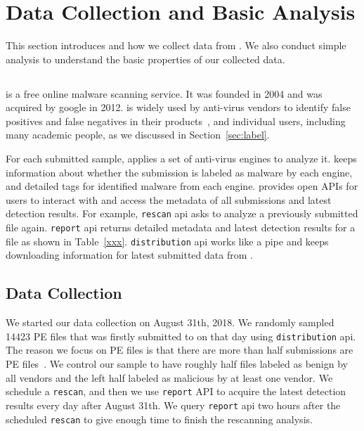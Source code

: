 \section{Data Collection and Basic Analysis}
\label{sec:data}

This section introduces \vt{} and how we collect data from \vt{}. 
We also conduct simple analysis to understand 
the basic properties of our collected data. 

\subsection{\vt{}}
\vt{} is a free online malware scanning service. 
It was founded in 2004 and was acquired by google in 2012. 
\vt{} is widely used by anti-virus vendors to identify false positives and false negatives 
in their products~\cite{huangvt2016bigdata, neeles}, 
and individual users, including many academic people, 
as we discussed in Section~\ref{sec:label}.

For each submitted sample, \vt{} applies a set of anti-virus engines to analyze it. 
\vt{} keeps information about whether the submission is labeled as malware by each engine, 
and detailed tags for identified malware from each engine. 
\vt{} provides open APIs for users to interact with \vt{} 
and access the metadata of all submissions and latest detection results.
For example, \texttt{rescan} api asks \vt{} to analyze a previously submitted file again. 
\texttt{report} api returns detailed metadata and latest 
detection results for a file as shown in Table~\ref{xxx}. 
\texttt{distribution} api works like a pipe and keeps 
downloading information for latest submitted data from \vt{}. 

\subsection{Data Collection}

We started our data collection on August 31th, 2018. 
We randomly sampled 14423 PE files that was firstly submitted to \vt{} 
on that day using \texttt{distribution} api.
The reason we focus on PE files is that there are more 
than half \vt{} submissions are PE files~\cite{SongAPsys2016}. 
We control our sample to have roughly 
half files labeled as benign by all vendors 
and the left half labeled as malicious by at least one vendor.
We schedule a \texttt{rescan}, and then we use \texttt{report} API to acquire
the latest detection results every day after August 31th. 
We query \texttt{report} api two hours after the scheduled \texttt{rescan} to give 
\vt{} enough time to finish the rescanning analysis. 

